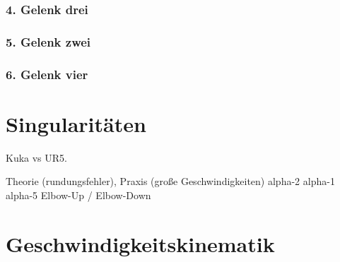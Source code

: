 \subsubsection{4. Gelenk drei}

\subsubsection{5. Gelenk zwei}

\subsubsection{6. Gelenk vier}


\section{Singularitäten}\label{sec:singularitaten}


Kuka vs UR5.

Theorie (rundungsfehler), Praxis (große Geschwindigkeiten)
alpha-2
alpha-1
alpha-5
Elbow-Up / Elbow-Down


\section{Geschwindigkeitskinematik}